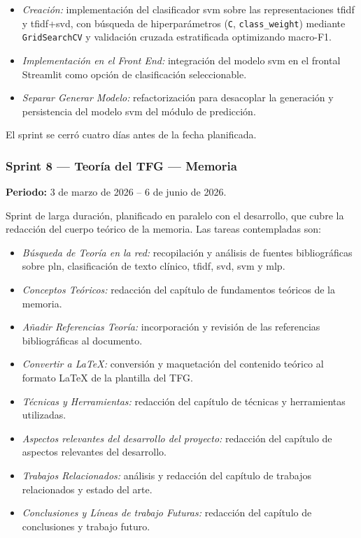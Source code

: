 \begin{itemize}
	\item \textit{Creación:} implementación del clasificador \gls{svm} sobre las representaciones \gls{tfidf} y \gls{tfidf}+\gls{svd}, con búsqueda de hiperparámetros (\texttt{C}, \texttt{class\_weight}) mediante \texttt{GridSearchCV} y validación cruzada estratificada optimizando macro-F1.
	\item \textit{Implementación en el Front End:} integración del modelo \gls{svm} en el frontal Streamlit como opción de clasificación seleccionable.
	\item \textit{Separar Generar Modelo:} refactorización para desacoplar la generación y persistencia del modelo \gls{svm} del módulo de predicción.
\end{itemize}

El sprint se cerró cuatro días antes de la fecha planificada.

\subsubsection*{Sprint 8 --- Teoría del TFG --- Memoria}

\textbf{Periodo:} 3 de marzo de 2026 -- 6 de junio de 2026.

Sprint de larga duración, planificado en paralelo con el desarrollo, que cubre la redacción del cuerpo teórico de la memoria. Las tareas contempladas son:

\begin{itemize}
	\item \textit{Búsqueda de Teoría en la red:} recopilación y análisis de fuentes bibliográficas sobre \gls{pln}, clasificación de texto clínico, \gls{tfidf}, \gls{svd}, \gls{svm} y \gls{mlp}.
	\item \textit{Conceptos Teóricos:} redacción del capítulo de fundamentos teóricos de la memoria.
	\item \textit{Añadir Referencias Teoría:} incorporación y revisión de las referencias bibliográficas al documento.
	\item \textit{Convertir a \LaTeX:} conversión y maquetación del contenido teórico al formato \LaTeX{} de la plantilla del TFG.
	\item \textit{Técnicas y Herramientas:} redacción del capítulo de técnicas y herramientas utilizadas.
	\item \textit{Aspectos relevantes del desarrollo del proyecto:} redacción del capítulo de aspectos relevantes del desarrollo.
	\item \textit{Trabajos Relacionados:} análisis y redacción del capítulo de trabajos relacionados y estado del arte.
	\item \textit{Conclusiones y Líneas de trabajo Futuras:} redacción del capítulo de conclusiones y trabajo futuro.
\end{itemize}

